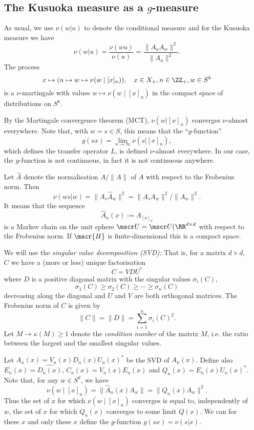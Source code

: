 \documentclass[11pt]{scrartcl}
\def\X{X}
\renewcommand{\H}{\mscr{H}}
\theoremstyle{plain} %
\theoremstyle{definition}
\begin{document}
\subsection{The Kusuoka measure as a $g$-measure}

As usual, we use $\nu(w|u)$ to denote the conditional measure and for
the Kusuoka measure we have 
$$ \nu(w|u)=\frac{\nu(wu)}{\nu(u)} = \frac{\|A_u A_w\|^2}{\| A_u \|^2}. $$
The process
$$ x\mapsto (n\mapsto w \mapsto \nu(w\mid [x]_n)), 
\quad x\in\X_+, n\in\ZZ_+, w\in S^k $$ is a $\nu$-martingale with
values $w\mapsto \nu(w \mid [x]_n)$ in the compact space of
distributions on $S^k$. 

By the Martingale convergence theorem (MCT), $\nu(w|[x]_n)$ 
converges $\nu$-almost everywhere. Note that, with $w=s\in S$, this
means that the ``$g$-function''
$$ g(sx) = \lim_{n\to\infty} \nu(s|[x]_n), $$ 
which defines the transfer operator $L$, is defined $\nu$-almost
everywhere. In our case, the $g$-function is not continuous, in fact
it is not continuous anywhere.

Let $\hat A$ denote the normalisation $A/\|A\|$ of $A$ with respect to
the Frobenius norm. Then 
$$\nu(ws|w) = \| A_s \hat A_w \|^2 = \| A_s A_w \|^2\big/\| A_w \|^2. $$ 
It means that the sequence 
$$\hat A_n(x) := \hat A_{[x]_n}$$ 
is a Markov chain on the unit sphere $\mscr U = \mscr
U(\RR^{d\times d}$ with respect to the Frobenius norm.
If $\H$ is finite-dimensional this is a compact space.

We will use the \emph{singular value decomposition (SVD):} That is, for a
matrix $d\times d$, $C$ we have a (more or less) unique factorisation
$$ C = V D U^*$$ 
where $D$ is a positive diagonal matrix with the singular values
$\sigma_i(C)$, 
$$ \sigma_1(C)\geq \sigma_2(C) \geq \cdots \geq \sigma_n(C) $$
decreasing along the diagonal and $U$ and $V$ are both orthogonal
matrices. The Frobenius norm of $C$ is given by 
$$ \| C \| = \| D\| = \sum_{i=1}^n \sigma_i(C)^2. $$ 
Let $M\to\kappa(M)\geq1$ denote the
\emph{condition number} of the matrix $M$, i.e. the ratio between the
largest and the smallest singular values.

Let $A_n(x)=V_n(x)D_n(x)U_n(x)^*$ be the SVD of $A_n(x)$. Define also 
$E_n(x)=\hat{D_n(x)}$, $C_n(x)=V_n(x)E_n(x)$ and
$Q_n(x)=E_n(x)U_n(x)^*$. Note that, for any $w\in S^k$, we have 
$$ \nu(w\mid [x]_n ) = \|\hat A_n(x) A_w \| = \| Q_n(x) A_w \|^2. $$
Thus the set of $x$ for which $\nu(w\mid [x]_n )$ converges is equal to,
independently of $w$, the set of $x$ for which $Q_n(x)$ converges to
some limit $Q(x)$. We can for these $x$ and only these $x$ define the
$g$-function $g(sx) = \nu(s|x)$. 
\end{document}

